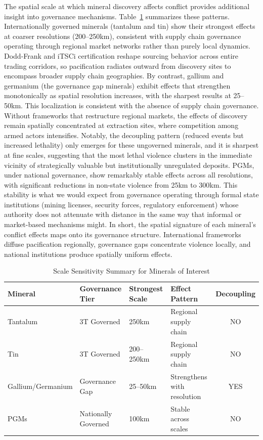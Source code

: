 \documentclass[11pt]{article}
\begin{document}
The spatial scale at which mineral discovery affects conflict provides additional insight into governance mechanisms. Table~\ref{tab:scale_summary} summarizes these patterns. Internationally governed minerals (tantalum and tin) show their strongest effects at coarser resolutions (200--250km), consistent with supply chain governance operating through regional market networks rather than purely local dynamics. Dodd-Frank and iTSCi certification reshape sourcing behavior across entire trading corridors, so pacification radiates outward from discovery sites to encompass broader supply chain geographies. By contrast, gallium and germanium (the governance gap minerals) exhibit effects that strengthen monotonically as spatial resolution increases, with the sharpest results at 25--50km. This localization is consistent with the absence of supply chain governance. Without frameworks that restructure regional markets, the effects of discovery remain spatially concentrated at extraction sites, where competition among armed actors intensifies. Notably, the decoupling pattern (reduced events but increased lethality) only emerges for these ungoverned minerals, and it is sharpest at fine scales, suggesting that the most lethal violence clusters in the immediate vicinity of strategically valuable but institutionally unregulated deposits. PGMs, under national governance, show remarkably stable effects across all resolutions, with significant reductions in non-state violence from 25km to 300km. This stability is what we would expect from governance operating through formal state institutions (mining licenses, security forces, regulatory enforcement) whose authority does not attenuate with distance in the same way that informal or market-based mechanisms might. In short, the spatial signature of each mineral's conflict effects maps onto its governance structure. International frameworks diffuse pacification regionally, governance gaps concentrate violence locally, and national institutions produce spatially uniform effects.


\begin{table}[H]
\centering
\caption{Scale Sensitivity Summary for Minerals of Interest}
\label{tab:scale_summary}
\begin{tabular}{p{3.5cm}p{2.5cm}p{2.5cm}p{3.5cm}c}
\toprule
Mineral & Governance Tier & Strongest Scale & Effect Pattern & Decoupling \\
\midrule
Tantalum & 3T Governed & 250km & Regional supply chain & NO \\
Tin & 3T Governed & 200--250km & Regional supply chain & NO \\
Gallium/Germanium & Governance Gap & 25--50km & Strengthens with resolution & YES \\
PGMs & Nationally Governed & 100km & Stable across scales & NO \\
\bottomrule
\end{tabular}
\end{table}
\end{document}
